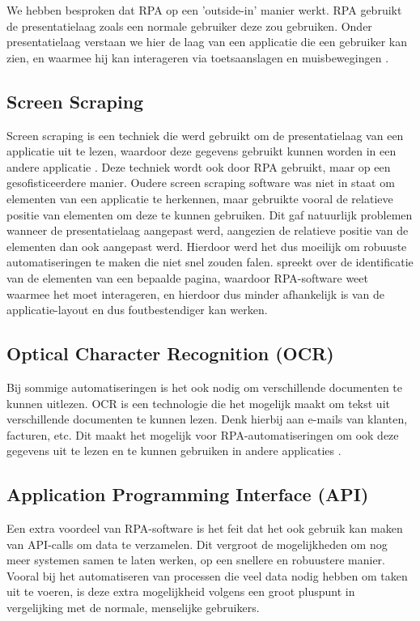 We hebben besproken dat RPA op een 'outside-in' manier werkt. RPA gebruikt de presentatielaag zoals een normale gebruiker deze zou gebruiken. Onder presentatielaag verstaan we hier de laag van een applicatie die een gebruiker kan zien, en waarmee hij kan interageren via toetsaanslagen en muisbewegingen \autocite{ZalewskaTurzynska2022}.

\subsection{Screen Scraping}

Screen scraping is een techniek die werd gebruikt om de presentatielaag van een applicatie uit te lezen, waardoor deze gegevens gebruikt kunnen worden in een andere applicatie \autocite{Spencer2018}. Deze techniek wordt ook door RPA gebruikt, maar op een gesofisticeerdere manier. Oudere screen scraping software was niet in staat om elementen van een applicatie te herkennen, maar gebruikte vooral de relatieve positie van elementen om deze te kunnen gebruiken. Dit gaf natuurlijk problemen wanneer de presentatielaag aangepast werd, aangezien de relatieve positie van de elementen dan ook aangepast werd. Hierdoor werd het dus moeilijk om robuuste automatiseringen te maken die niet snel zouden falen. \textcite{Asquith2019} spreekt over de identificatie van de elementen van een bepaalde pagina, waardoor RPA-software weet waarmee het moet interageren, en hierdoor dus minder afhankelijk is van de applicatie-layout en dus foutbestendiger kan werken.

\subsection{Optical Character Recognition (OCR)}

Bij sommige automatiseringen is het ook nodig om verschillende documenten te kunnen uitlezen. OCR is een technologie die het mogelijk maakt om tekst uit verschillende documenten te kunnen lezen. Denk hierbij aan e-mails van klanten, facturen, etc. Dit maakt het mogelijk voor RPA-automatiseringen om ook deze gegevens uit te lezen en te kunnen gebruiken in andere applicaties \autocite{ZalewskaTurzynska2022}.

\subsection{Application Programming Interface (API)}

Een extra voordeel van RPA-software is het feit dat het ook gebruik kan maken van API-calls om data te verzamelen. Dit vergroot de mogelijkheden om nog meer systemen samen te laten werken, op een snellere en robuustere manier. Vooral bij het automatiseren van processen die veel data nodig hebben om taken uit te voeren, is deze extra mogelijkheid volgens \textcite{Hofmann2020} een groot pluspunt in vergelijking met de normale, menselijke gebruikers.

